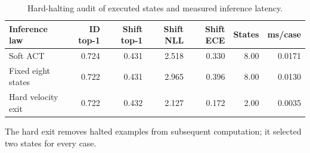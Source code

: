 \begin{table}[t]
\centering
\caption{Hard-halting audit of executed states and measured inference latency.}
\label{tab:hard_halting}
\begin{tabular}{lrrrrrr}
\toprule
Inference law & ID top-1 & Shift top-1 & Shift NLL & Shift ECE & States & ms/case \\
\midrule
Soft ACT & 0.724 & 0.431 & 2.518 & 0.330 & 8.00 & 0.0171 \\
Fixed eight states & 0.722 & 0.431 & 2.965 & 0.396 & 8.00 & 0.0130 \\
Hard velocity exit & 0.722 & 0.432 & 2.127 & 0.172 & 2.00 & 0.0035 \\
\bottomrule
\end{tabular}
\begin{minipage}{0.96\linewidth}\footnotesize The hard exit removes halted examples from subsequent computation; it selected two states for every case.\end{minipage}
\end{table}
